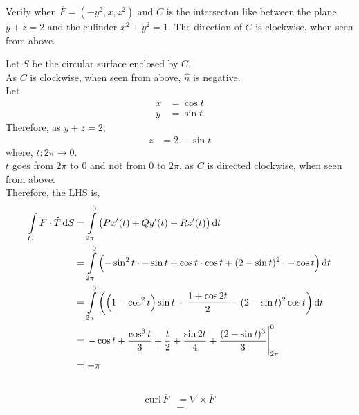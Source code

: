 \documentclass[fleqn, a4paper, 12pt, twoside]{article}
\theoremstyle{definition}
\theoremstyle{theorem}
\newcommand{\curl}{\mathrm{curl\,}}
\begin{document}
{\begin{question}
	Verify  when $\overline{F} = \left( -y^2 , x , z^2 \right)$ and $C$ is the intersecton like between the plane $y + z = 2$ and the culinder $x^2 + y^2 = 1$.
	The direction of $C$ is clockwise, when seen from above.
\end{question}

\begin{solution}
	Let $S$ be the circular surface enclosed by $C$.\\
	As $C$ is clockwise, when seen from above, $\hat{n}$ is negative.\\
	Let
	\begin{align*}
		x & = \cos t \\
		y & = \sin t
	\end{align*}
	Therefore, as $y + z = 2$,
	\begin{align*}
		z & = 2 - \sin t
	\end{align*}
	where, $t : 2 \pi \to 0$.\\
	$t$ goes from $2 \pi$ to $0$ and not from $0$ to $2 \pi$, as $C$ is directed clockwise, when seen from above.\\
	Therefore, the LHS is,
	\begin{align*}
		\int\limits_{C} \overline{F} \cdot \hat{T} \dif S & = \int\limits_{2 \pi}^{0} \left( P x'(t) + Q y'(t) + R z'(t) \right) \dif t                                                         \\
                                                                  & = \int\limits_{2 \pi}^{0} \left( -\sin^2 t \cdot -\sin t + \cos t \cdot \cos t + (2 - \sin t)^2 \cdot -\cos t \right) \dif t        \\
                                                                  & = \int\limits_{2 \pi}^{0} \left( \left( 1 - \cos^2 t \right) \sin t + \frac{1 + \cos 2 t}{2} - (2 - \sin t)^2 \cos t \right) \dif t \\
                                                                  & = \left. -\cos t + \frac{\cos^3 t}{3} + \frac{t}{2} + \frac{\sin 2 t}{4} + \frac{(2 - \sin t)^3}{3} \right|_{2 \pi}^{0}             \\
                                                                  & = -\pi
	\end{align*}
	~\\
	\begin{align*}
		\curl \overline{F} &= \nabla \times \overline{F}\\
		                   &=

\end{align*}
\end{solution}}
\end{document}
